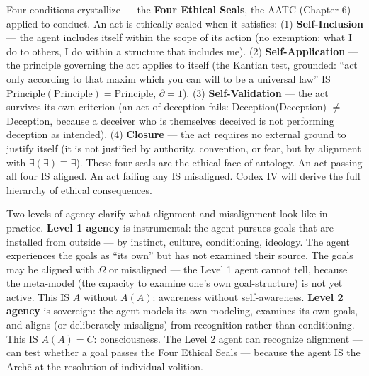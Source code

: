 \documentclass[10pt, openany, oneside]{book}
\begin{document}
Four conditions crystallize --- the \textbf{Four Ethical Seals}, the AATC (Chapter 6) applied to conduct. An act is ethically sealed when it satisfies: (1) \textbf{Self-Inclusion} --- the agent includes itself within the scope of its action (no exemption: what I do to others, I do within a structure that includes me). (2) \textbf{Self-Application} --- the principle governing the act applies to itself (the Kantian test, grounded: ``act only according to that maxim which you can will to be a universal law'' IS $\text{Principle}(\text{Principle}) = \text{Principle}$, $\partial = 1$). (3) \textbf{Self-Validation} --- the act survives its own criterion (an act of deception fails: Deception(Deception) $\neq$ Deception, because a deceiver who is themselves deceived is not performing deception as intended). (4) \textbf{Closure} --- the act requires no external ground to justify itself (it is not justified by authority, convention, or fear, but by alignment with $\exists(\exists) \equiv \exists$). These four seals are the ethical face of autology. An act passing all four IS aligned. An act failing any IS misaligned. Codex IV will derive the full hierarchy of ethical consequences.

Two levels of agency clarify what alignment and misalignment look like in practice. \textbf{Level 1 agency} is instrumental: the agent pursues goals that are installed from outside --- by instinct, culture, conditioning, ideology. The agent experiences the goals as ``its own'' but has not examined their source. The goals may be aligned with $\Omega$ or misaligned --- the Level 1 agent cannot tell, because the meta-model (the capacity to examine one's own goal-structure) is not yet active. This IS $A$ without $A(A)$: awareness without self-awareness. \textbf{Level 2 agency} is sovereign: the agent models its own modeling, examines its own goals, and aligns (or deliberately misaligns) from recognition rather than conditioning. This IS $A(A) = C$: consciousness. The Level 2 agent can recognize alignment --- can test whether a goal passes the Four Ethical Seals --- because the agent IS the Arch\={e} at the resolution of individual volition.
\end{document}

